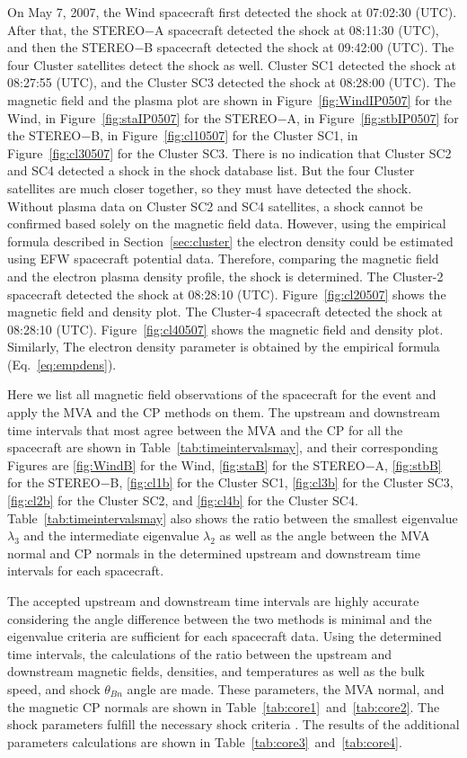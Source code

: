 \documentclass[draft]{agujournal2019}
\begin{document}
On May 7, 2007, the Wind spacecraft first detected the shock at {07:02:30} (UTC). After that, the STEREO$-$A spacecraft detected the shock at {08:11:30} (UTC), and then the STEREO$-$B spacecraft detected the shock at {09:42:00} (UTC). The four Cluster satellites detect the shock as well. Cluster SC1 detected the shock at {08:27:55} (UTC), and the Cluster SC3 detected the shock at {08:28:00} (UTC). The magnetic field and the plasma plot are shown in Figure~\ref{fig:WindIP0507} for the Wind, in Figure~\ref{fig:staIP0507} for the STEREO$-$A, in Figure~\ref{fig:stbIP0507} for the STEREO$-$B, in Figure~\ref{fig:cl10507} for the Cluster SC1, in Figure~\ref{fig:cl30507} for the Cluster SC3. There is no indication that Cluster SC2 and SC4 detected a shock in the shock database list. But the four Cluster satellites are much closer together, so they must have detected the shock. Without plasma data on Cluster SC2 and SC4 satellites, a shock cannot be confirmed based solely on the magnetic field data. However, using the empirical formula described in Section~\ref{sec:cluster} the electron density could be estimated using EFW spacecraft potential data. Therefore, comparing the magnetic field and the electron plasma density profile, the shock is determined. The Cluster-2 spacecraft detected the shock at 08:28:10 (UTC). Figure~\ref{fig:cl20507} shows the magnetic field and density plot. The Cluster-4 spacecraft detected the shock at 08:28:10 (UTC). Figure~\ref{fig:cl40507} shows the magnetic field and density plot. Similarly, The electron density parameter is obtained by the empirical formula (Eq.~\ref{eq:empdens}).

Here we list all magnetic field observations of the spacecraft for the event and apply the MVA and the CP methods on them. The upstream and downstream time intervals that most agree between the MVA and the CP for all the spacecraft are shown in Table~\ref{tab:timeintervalsmay}, and their corresponding Figures are \ref{fig:WindB} for the Wind, \ref{fig:staB} for the STEREO$-$A, \ref{fig:stbB} for the STEREO$-$B, \ref{fig:cl1b} for the Cluster SC1, \ref{fig:cl3b} for the Cluster SC3, \ref{fig:cl2b} for the Cluster SC2, and \ref{fig:cl4b} for the Cluster SC4. Table~\ref{tab:timeintervalsmay} also shows the ratio between the smallest eigenvalue $\lambda_{3}$ and the intermediate eigenvalue $\lambda_{2}$ as well as the angle between the MVA normal and CP normals in the determined upstream and downstream time intervals for each spacecraft. 

The accepted upstream and downstream time intervals are highly accurate considering the angle difference between the two methods is minimal and the eigenvalue criteria are sufficient for each spacecraft data. Using the determined time intervals, the calculations of the ratio between the upstream and downstream magnetic fields, densities, and temperatures as well as the bulk speed, and shock $\theta_{Bn}$ angle are made. These parameters, the MVA normal, and the magnetic CP normals are shown in Table~\ref{tab:core1}~and~\ref{tab:core2}. The shock parameters fulfill the necessary shock criteria \cite{lumme17:_datab_helios_shock_waves}. The results of the additional parameters calculations are shown in Table~\ref{tab:core3}~and~\ref{tab:core4}.
\end{document}
